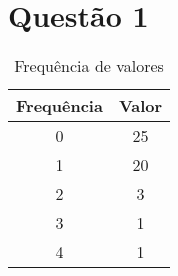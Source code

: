 \documentclass{article}
\begin{document}
\section*{Questão 1}

\begin{table}[htb]
    \centering
    \begin{tabular}{|c|c|}
        \hline
        \textbf{Frequência} & \textbf{Valor} \\
        \hline
        0 & 25 \\
        1 & 20 \\
        2 & 3 \\
        3 & 1 \\
        4 & 1 \\
        \hline
    \end{tabular}
    \caption{Frequência de valores}
    \label{tab:frequencia_valores}
\end{table}
\end{document}
